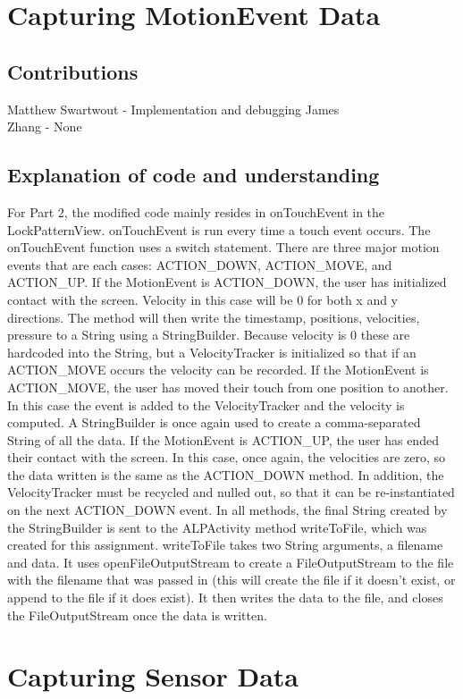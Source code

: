 \documentclass{article}
\begin{document}
\section{Capturing MotionEvent Data}
\subsection{Contributions}
Matthew Swartwout - Implementation and debugging James \\
Zhang - None

\subsection{Explanation of code and understanding} 
For Part 2, the modified code mainly
resides in onTouchEvent in the LockPatternView. onTouchEvent is run every time
a touch event occurs. The onTouchEvent function uses a switch statement. There
are three major motion events that are each cases: ACTION\_DOWN, ACTION\_MOVE,
and ACTION\_UP.  If the MotionEvent is ACTION\_DOWN, the user has initialized
contact with the screen. Velocity in this case will be 0 for both x and y
directions. The method will then write the timestamp, positions, velocities,
pressure to a String using a StringBuilder. Because velocity is 0 these are
hardcoded into the String, but a VelocityTracker is initialized so that if an
ACTION\_MOVE occurs the velocity can be recorded.  If the MotionEvent is
ACTION\_MOVE, the user has moved their touch from one position to another. In
this case the event is added to the VelocityTracker and the velocity is
computed. A StringBuilder is once again used to create a comma-separated String
of all the data.  If the MotionEvent is ACTION\_UP, the user has ended their
contact with the screen. In this case, once again, the velocities are zero, so
the data written is the same as the ACTION\_DOWN method. In addition, the
VelocityTracker must be recycled and nulled out, so that it can be
re-instantiated on the next ACTION\_DOWN event.  In all methods, the final
String created by the StringBuilder is sent to the ALPActivity method
writeToFile, which was created for this assignment. writeToFile takes two
String arguments, a filename and data. It uses openFileOutputStream to create a
FileOutputStream to the file with the filename that was passed in (this will
create the file if it doesn’t exist, or append to the file if it does exist).
It then writes the data to the file, and closes the FileOutputStream once the
data is written.

\section{Capturing Sensor Data} 
\end{document}
